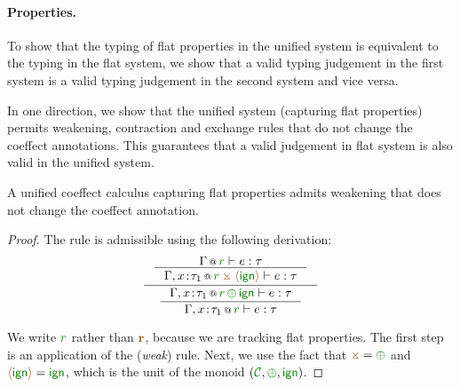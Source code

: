\paragraph{Properties.}
To show that the typing of flat properties in the unified system is equivalent to the typing in the
flat system, we show that a valid typing judgement in the first system is a valid typing judgement in 
the second system and vice versa.

In one direction, we show that the unified system (capturing flat properties) permits weakening, 
contraction and exchange rules that do not change the coeffect annotations. This guarantees that
a valid judgement in flat system is also valid in the unified system.

\begin{lemma}
\label{thm:unified-weak}
A unified coeffect calculus capturing flat properties admits weakening that does not change the
coeffect annotation.
\end{lemma}
\begin{proof}
The rule is admissible using the following derivation:
\begin{equation*}
\inference
  { \inference
      {\coctx{\Gamma}{ \cclrd{r} } \vdash e : \tau}
      {\coctx{\Gamma,x \!:\! \tau_1}{\cclrd{r} \;\apar\; \alift{ \czero }} \vdash e : \tau} }
  { \inference
      {\coctx{\Gamma,x \!:\! \tau_1}{\cclrd{r} \,\cpar\, \czero} \vdash e : \tau}      
      {\coctx{\Gamma,x \!:\! \tau_1}{\cclrd{r}} \vdash e : \tau} }
\end{equation*}

\noindent
We write $\cclrd{r}$ rather than $\aclrd{\textbf{r}}$, because we are tracking flat properties.
The first step is an application of the (\emph{weak}) rule. Next, we use the fact that
$\apar=\cpar$ and $\alift{\czero}=\czero$, which is the unit of the monoid $(\C, \cpar, \czero)$.
\end{proof}

